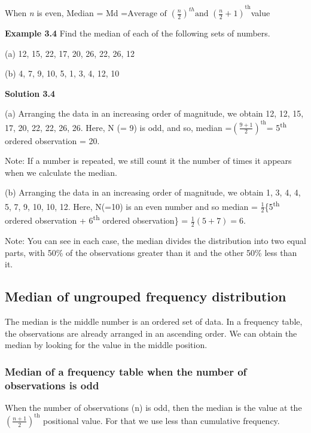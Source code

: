 \documentclass[
]{book}
\begin{document}
When \emph{n} is even, Median = Md
=\({\text{Average\ of\ }\left( \frac{n}{2} \right)^{th}\text{and\ }\left( \frac{n}{2} + 1 \right)}^{\text{th}}\)value

\textbf{Example 3.4} Find the median of each of the following sets of
numbers.

(a) 12, 15, 22, 17, 20, 26, 22, 26, 12

(b) 4, 7, 9, 10, 5, 1, 3, 4, 12, 10

\textbf{Solution 3.4}

(a) Arranging the data in an increasing order of magnitude, we
obtain 12, 12, 15, 17, 20, 22, 22, 26, 26. Here, N (= 9) is odd, and so,
median =\(\left( \frac{9 + 1}{2} \right)^{\text{th}}\)= 5\textsuperscript{th} ordered
observation = 20.

Note: If a number is repeated, we still count it the number of times it
appears when we calculate the median.

(b) Arranging the data in an increasing order of magnitude, we obtain
1, 3, 4, 4, 5, 7, 9, 10, 10, 12. Here, N(=10) is an even number and so
median = \(\frac{1}{2}\)\{5\textsuperscript{th} ordered observation + 6\textsuperscript{th} ordered
observation\} = \(\frac{1}{2}\left( 5 + 7 \right) = 6\).

Note: You can see in each case, the median divides the distribution into
two equal parts, with 50\% of the observations greater than it and the
other 50\% less than it.

\hypertarget{median-of-ungrouped-frequency-distribution}{%
\subsection{Median of ungrouped frequency distribution}\label{median-of-ungrouped-frequency-distribution}}

The median is the middle number is an ordered set of data. In a
frequency table, the observations are already arranged in an ascending
order. We can obtain the median by looking for the value in the middle
position.

\hypertarget{median-of-a-frequency-table-when-the-number-of-observations-is-odd}{%
\subsubsection{Median of a frequency table when the number of observations is odd}\label{median-of-a-frequency-table-when-the-number-of-observations-is-odd}}

When the number of observations (n) is odd, then the median is the value
at the~\(\left( \frac{n + 1}{2} \right)^{\text{th}}\) positional value.
For that we use less than cumulative frequency.
\end{document}
